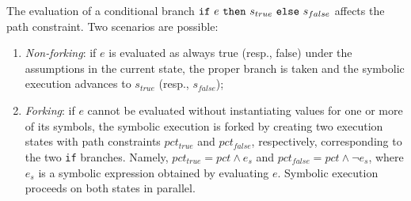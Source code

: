 The evaluation of a conditional branch ${\tt if}~e~{\tt then}~s_{true}~{\tt else}~s_{false}$ affects the path constraint. Two scenarios are possible:
    \begin{enumerate}
      \item {\em Non-forking}: if $e$ is evaluated as always true (resp., false) under the assumptions in the current state, the proper branch is taken and the symbolic execution advances to $s_{true}$ (resp., $s_{false}$);
      \item {\em Forking}: if $e$ cannot be evaluated without instantiating values for one or more of its symbols, the symbolic execution is forked by creating two execution states with path constraints $pct_{true}$ and $pct_{false}$, respectively, corresponding to the two {\tt if} branches. Namely, $pct_{true}=pct \wedge e_s$ and $pct_{false}=pct \wedge \neg e_s$, where $e_s$ is a symbolic expression obtained by evaluating $e$. 
    Symbolic execution proceeds on both states in parallel.
    \end{enumerate}


